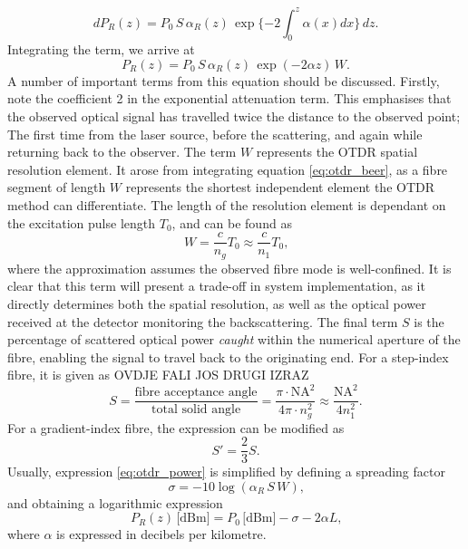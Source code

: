 \documentclass{standalone}
\begin{document}
\begin{equation} \label{eq:otdr_beer}
dP_R(z) = P_0 \, S \, \alpha_R(z) \, \exp\{ -2 \int_{0}^{z} \alpha(x) dx \} \, dz \textrm{.}
\end{equation}
Integrating the term, we arrive at
\begin{equation} \label{eq:otdr_power}
P_R(z) = P_0 \, S \, \alpha_R(z) \, \exp\left(-2 \alpha z\right) \, W \textrm{.}
\end{equation}
A number of important terms from this equation should be discussed. Firstly, note the coefficient 2 in the exponential attenuation term. This emphasises that the observed optical signal has travelled twice the distance to the observed point; The first time from the laser source, before the scattering, and again while returning back to the observer. The term $W$ represents the OTDR spatial resolution element. It arose from integrating equation \ref{eq:otdr_beer}, as a fibre segment of length $W$ represents the shortest independent element the OTDR method can differentiate. The length of the resolution element is dependant on the excitation pulse length $T_0$, and can be found as
\begin{equation} \label{eq:otdr_resolution}
W = \frac{c}{n_g} T_0 \approx \frac{c}{n_1} T_0 \textrm{,}
\end{equation}
where the approximation assumes the observed fibre mode is well-confined. It is clear that this term will present a trade-off in system implementation, as it directly determines both the spatial resolution, as well as the optical power received at the detector monitoring the backscattering. The final term $S$ is the percentage of scattered optical power \textit{caught} within the numerical aperture of the fibre, enabling the signal to travel back to the originating end. For a step-index fibre, it is given as OVDJE FALI JOS DRUGI IZRAZ
\begin{equation}
S = \frac{\textrm{fibre acceptance angle}}{\textrm{total solid angle}} = \frac{\pi \cdot \textrm{NA}^2}{4 \pi \cdot n_g^2} \approx \frac{\textrm{NA}^2}{4n_1^2} \textrm{.}
\end{equation}
For a gradient-index fibre, the expression can be modified as
\begin{equation}
S' = \frac{2}{3} S \textrm{.}
\end{equation}
Usually, expression \ref{eq:otdr_power} is simplified by defining a spreading factor
\begin{equation}
\sigma = -10 \log \left( \alpha_R \, S \, W \right) \textrm{,}
\end{equation}
and obtaining a logarithmic expression
\begin{equation}
P_R(z) \,\textrm{[dBm]} = P_0 \,\textrm{[dBm]} - \sigma - 2\alpha L \textrm{,}
\end{equation}
where $\alpha$ is expressed in decibels per kilometre. \\
\end{document}
